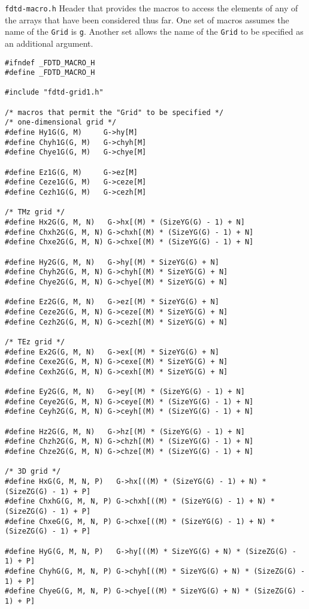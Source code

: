 \begin{program} {\tt fdtd-macro.h} Header that provides the macros to
  access the elements of any of the arrays that have been considered
  thus far.  One set of macros assumes the name of the {\tt Grid} is
  {\tt g}.  Another set allows the name of the {\tt Grid} to be
  specified as an additional argument.
\label{pro:fdtdmacro}
\codemiddle
\begin{lstlisting}
#ifndef _FDTD_MACRO_H
#define _FDTD_MACRO_H

#include "fdtd-grid1.h"

/* macros that permit the "Grid" to be specified */
/* one-dimensional grid */
#define Hy1G(G, M)     G->hy[M]
#define Chyh1G(G, M)   G->chyh[M]
#define Chye1G(G, M)   G->chye[M]

#define Ez1G(G, M)     G->ez[M]
#define Ceze1G(G, M)   G->ceze[M]
#define Cezh1G(G, M)   G->cezh[M]

/* TMz grid */
#define Hx2G(G, M, N)   G->hx[(M) * (SizeYG(G) - 1) + N]
#define Chxh2G(G, M, N) G->chxh[(M) * (SizeYG(G) - 1) + N]
#define Chxe2G(G, M, N) G->chxe[(M) * (SizeYG(G) - 1) + N]

#define Hy2G(G, M, N)   G->hy[(M) * SizeYG(G) + N]
#define Chyh2G(G, M, N) G->chyh[(M) * SizeYG(G) + N]
#define Chye2G(G, M, N) G->chye[(M) * SizeYG(G) + N]

#define Ez2G(G, M, N)   G->ez[(M) * SizeYG(G) + N]
#define Ceze2G(G, M, N) G->ceze[(M) * SizeYG(G) + N]
#define Cezh2G(G, M, N) G->cezh[(M) * SizeYG(G) + N]

/* TEz grid */
#define Ex2G(G, M, N)   G->ex[(M) * SizeYG(G) + N]
#define Cexe2G(G, M, N) G->cexe[(M) * SizeYG(G) + N]
#define Cexh2G(G, M, N) G->cexh[(M) * SizeYG(G) + N]

#define Ey2G(G, M, N)   G->ey[(M) * (SizeYG(G) - 1) + N]
#define Ceye2G(G, M, N) G->ceye[(M) * (SizeYG(G) - 1) + N]
#define Ceyh2G(G, M, N) G->ceyh[(M) * (SizeYG(G) - 1) + N]

#define Hz2G(G, M, N)   G->hz[(M) * (SizeYG(G) - 1) + N]
#define Chzh2G(G, M, N) G->chzh[(M) * (SizeYG(G) - 1) + N]
#define Chze2G(G, M, N) G->chze[(M) * (SizeYG(G) - 1) + N]

/* 3D grid */
#define HxG(G, M, N, P)   G->hx[((M) * (SizeYG(G) - 1) + N) * (SizeZG(G) - 1) + P]
#define ChxhG(G, M, N, P) G->chxh[((M) * (SizeYG(G) - 1) + N) * (SizeZG(G) - 1) + P]
#define ChxeG(G, M, N, P) G->chxe[((M) * (SizeYG(G) - 1) + N) * (SizeZG(G) - 1) + P]

#define HyG(G, M, N, P)   G->hy[((M) * SizeYG(G) + N) * (SizeZG(G) - 1) + P]
#define ChyhG(G, M, N, P) G->chyh[((M) * SizeYG(G) + N) * (SizeZG(G) - 1) + P]
#define ChyeG(G, M, N, P) G->chye[((M) * SizeYG(G) + N) * (SizeZG(G) - 1) + P]


\end{lstlisting}
\end{program}
